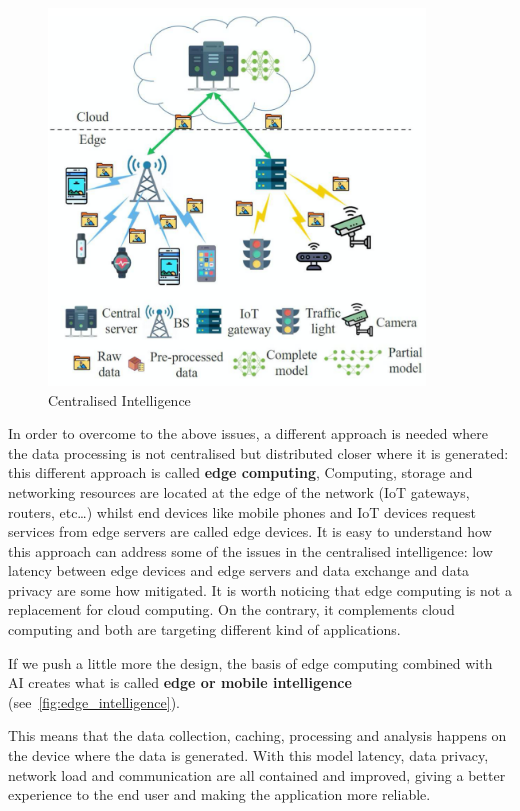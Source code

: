 \begin{figure}[ht]
    \includegraphics[width=10cm]{images/introduction/centralised_intelligence.png}
    \centering
    \caption{Centralised Intelligence}\label{fig:centralised_intelligence}
\end{figure}

In order to overcome to the above issues, a different approach is needed where
the data processing is not centralised but distributed closer where it is
generated: this different approach is called \textbf{edge computing},
Computing, storage and networking resources are located at the edge of the
network (IoT gateways, routers, etc\ldots) whilst end devices like mobile
phones and IoT devices request services from edge servers are called edge
devices.
It is easy to understand how this approach can address some of the issues in
the centralised intelligence: low latency between edge devices and edge servers
and data exchange and data privacy are some how mitigated.
It is worth noticing that edge computing is not a replacement for cloud
computing. On the contrary, it complements cloud computing and both are
targeting different kind of applications.

If we push a little more the design, the basis of edge computing combined with
AI creates what is called
\textbf{edge or mobile intelligence} (see~\ref{fig:edge_intelligence}).

This means that the data collection, caching, processing and analysis happens
on the device where the data is generated.
With this model latency, data privacy, network load and communication are all
contained and improved, giving a better experience to the end user and making
the application more reliable.

